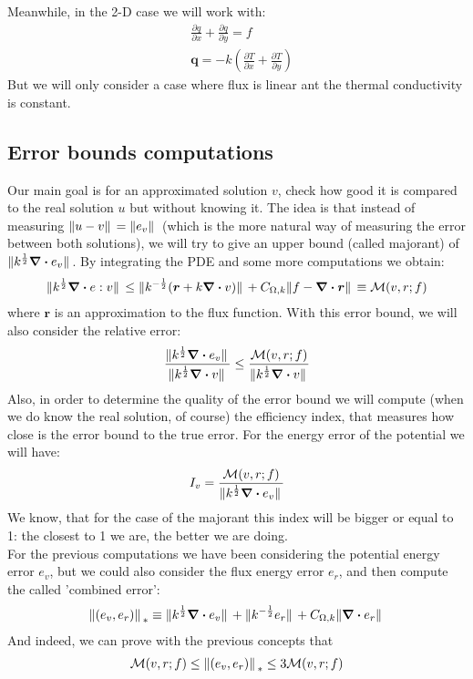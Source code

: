 \documentclass{article}
\begin{document}
    Meanwhile, in the 2-D case we will work with:
    \begin{align*}
        &\frac{\partial q}{\partial x} + \frac{\partial q}{\partial y}  = f \\
        &\bm{q} = -k \left( \frac{\partial T}{\partial x} + \frac{\partial T}{\partial y}\right)
    \end{align*}
    But we will only consider a case where flux is linear ant the thermal conductivity is constant.
    
    \subsection*{Error bounds computations}
    Our main goal is for an approximated solution $v$, check how good it is compared to the real solution $u$ but without knowing it. The idea is that instead of measuring $\norm*{u-v} = \norm*{e_v}$ (which is the more natural way of measuring the error between both solutions), we will try to give an upper bound (called majorant) of $\norm*{k^{\frac{1}{2}}\div e_v}$. By integrating the PDE and some more computations we obtain:
    \begin{align*}
        \norm*{k^{\frac{1}{2}}\div e:v} \leq \norm*{k^{-\frac{1}{2}}(\bm{r}+k\div v)} + C_{\Omega,k}\norm*{f-\div \bm{r}} \equiv \mathcal{M}(v,r;f)
    \end{align*}
    where $\bm{r}$ is an approximation to the flux function.
    With this error bound, we will also consider the relative error:
    \begin{align*}
        \frac{\norm*{k^{\frac{1}{2}}\div e_v}}{\norm*{k^{\frac{1}{2}}\div v}} \leq \frac{\mathcal{M}(v,r;f)}{\norm*{k^{\frac{1}{2}}\div v}}
    \end{align*}
    Also, in order to determine the quality of the error bound we will compute (when we do know the real solution, of course) the efficiency index, that measures how close is the error bound to the true error. For the energy error of the potential we will have:
    \begin{align*}
        I_v = \frac{\mathcal{M}(v,r;f)}{\norm*{k^{\frac{1}{2}}\div e_v}}
    \end{align*}
    We know, that for the case of the majorant this index will be bigger or equal to 1: the closest to 1 we are, the better we are doing.\\
    For the previous computations we have been considering the potential energy error $e_v$, but we could also consider the flux energy error $e_r$, and then compute the called 'combined error':
    \begin{align*}
        \norm*{(e_v,e_r)}_{*} \equiv \norm*{k^{\frac{1}{2}}\div e_v} + \norm*{k^{-\frac{1}{2}}e_r} + C_{\Omega,k}\norm*{\div e_r}
    \end{align*} 
    And indeed, we can prove with the previous concepts that 
    \begin{align*}
        \mathcal{M}(v,r;f) \leq  \norm*{(e_v,e_r)}_{*}  \leq 3\mathcal{M}(v,r;f)
    \end{align*}
\end{document}
